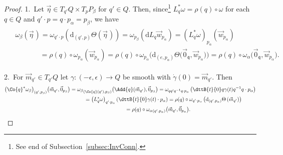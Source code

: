 \begin{proof}
1.~Let $\vec{\eta}\in T_{q'}Q\times T_pP_\beta$ for $q'\in Q$.
Then, since\footnote{See end of Subsection~\ref{subsec:InvConn}.} $L_q^{*}\omega = \rho(q)\circ \omega$ for each $q\in Q$
and $q'\cdot p= q\cdot p_\alpha =p_\beta$, we have
\begin{gather*}
\begin{split}
&\omega_\beta(\vec{\eta}\hspace{1pt})=\omega_{q'\cdot p}(\mathrm{d}_{(q', p)}\Theta (\vec{\eta}\hspace{1pt}))=\omega_{p_\beta}(\mathrm{d}
L_q\vec{w}_{p_\alpha}) =(L_q^{*}\omega)_{p_\alpha}(\vec{w}_{p_\alpha})
\\
&\phantom{\omega_\beta(\vec{\eta})}=\rho(q)\circ \omega_{p_\alpha}(\vec{w}_{p_\alpha})=\rho(q)\circ \omega_{p_\alpha}\big(\mathrm{d}_{(e,p_\alpha)}\Theta
\big(\vec{0}_\mathfrak{q},\vec{w}_{p_\alpha}\big)\big)
=\rho(q)\circ
\omega_{\alpha}\big(\vec{0}_\mathfrak{q},\vec{w}_{p_\alpha}\big).
\end{split}
\end{gather*}

2.~For $\vec{m}_{q'} \in T_{q'}Q$ let $\gamma \colon (-\epsilon,\epsilon)\rightarrow Q$ be smooth with
$\dot\gamma(0)=\vec{m}_{q'}$.
Then
\begin{gather*}
\big(\Co{q}^{*}\omega_\beta
\big)_{(q',p_\beta)}\big(\vec{m}_{q'},\vec{0}_{p_\beta}\big)
={\omega_\beta}_{(\Co{q}(q'),p_\beta)}\big(\Add{q}(\vec{m}_{q'}),\vec{0}_{p_\beta}\big)
=\omega_{qq'q^{-1}q\cdot p_\alpha }\left(\dttB{t}{0}q\gamma(t) q^{-1}q\cdot p_\alpha\right)
\\
\hphantom{\big(\Co{q}^{*}\omega_\beta
\big)_{(q',p_\beta)}\big(\vec{m}_{q'},\vec{0}_{p_\beta}\big)}{}
=\left(L_q^{*}\omega\right)_{q'\cdot p_\alpha }\left(\dttB{t}{0}\gamma(t)\cdot p_\alpha\right)
=\rho(q)\circ \omega_{q'\cdot p_\alpha}\left(\mathrm{d}_{(q',p_\alpha)}\Theta\left( \vec{m}_{q'}\right)\right)
\\
\hphantom{\big(\Co{q}^{*}\omega_\beta
\big)_{(q',p_\beta)}\big(\vec{m}_{q'},\vec{0}_{p_\beta}\big)}{}
=\rho(q)\circ {\omega_\alpha}_{(q',p_\alpha)} \big(\vec{m}_{q'},\vec{0}_{p_\alpha}\big).\tag*{\qed}
\end{gather*}
\renewcommand{\qed}{}
\end{proof}


